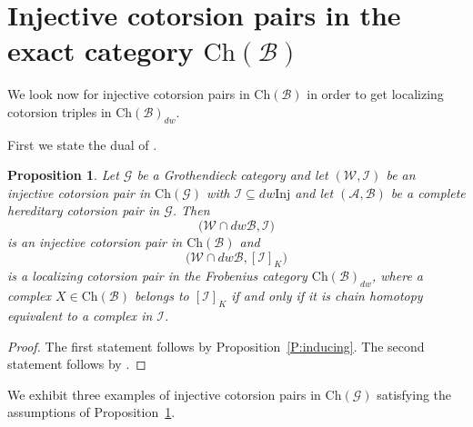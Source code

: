 \documentclass[11pt,a4paper,reqno]{amsart}
\newcommand{\A}{\mathcal{A}}
\newcommand{\B}{\mathcal{B}}
\newcommand{\G}{\mathcal{G}}
\newcommand{\I}{\mathcal{I}}
\newcommand{\W}{\mathcal{W}}
\newcommand{\Ch}{\mathrm{Ch}}
\newcommand{\Inj}{\mathrm{Inj}}
\theoremstyle{plain}
\newtheorem{prop}[thm]{Proposition}
\theoremstyle{definition}
\theoremstyle{remark}
\begin{document}
 \section{Injective cotorsion pairs in the exact category $\Ch(\B)$}\label{S:B-2}

 We look now for injective cotorsion pairs in $\Ch(\B)$ in order to get localizing cotorsion triples in $\Ch(\B)_{dw}$.

First we state the dual of \cite[Proposition 7.2]{G7}.
\begin{prop}\label{P:prop7.2} Let $\G$ be a Grothendieck category and let $(\W, \I)$ be an injective cotorsion pair in $\Ch(\G)$ with $\I\subseteq dw \Inj$ and let $(\A, \B)$ be a complete hereditary cotorsion pair in $\G$. Then \[\Big(\W\cap dw \B, \I\Big)\] is an injective cotorsion pair in $\Ch(\B)$ and \[\Big(\W\cap dw \B, [\I]_K\Big)\] is a localizing cotorsion pair in the Frobenius category $\Ch(\B)_{dw}$, where a complex $X\in \Ch(\B)$ belongs to $[\I]_K$ if and only if it is chain homotopy equivalent to a complex in $\I$.
\end{prop}

%
\begin{proof} The first statement follows by Proposition~\ref{P:inducing}. The second statement follows by \cite[Theorem 6.3]{G7}.
\end{proof}


%

We exhibit three examples of injective cotorsion pairs in $\Ch(\G)$ satisfying the assumptions of Proposition~\ref{P:prop7.2}.
\end{document}
